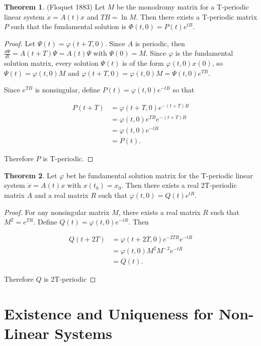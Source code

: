 \documentclass[12pt]{article}
\theoremstyle{definition}
\newtheorem{theorem}{Theorem}[section]  %
\begin{document}
\begin{theorem}(Floquet 1883)
Let $M$ be the monodromy matrix for a T-periodic linear system $\dot{x} = A(t)x$ and $TB = \ln M$. Then
there exists a T-periodic matrix $P$ such that the fundamental solution is $\Phi (t, 0) = P(t)e^{tB}$.
\end{theorem}

\begin{proof}
Let $\Psi (t) = \varphi(t + T, 0)$. Since $A$ is periodic, then  $\frac{d\Psi}{dt} = A(t + T)\Psi = A(t)\Psi$
with $\Psi(0) = M$. Since $\varphi$ is the fundamental solution matrix, every solution $\Psi(t)$ is of the
form $\varphi(t, 0)x(0)$, so $\Psi(t) = \varphi(t, 0)M$ and $\varphi(t + T, 0) = \varphi(t, 0)M = \Psi(t,0)e^{TB}$.

Since $e^{TB}$ is nonsingular, define $P(t) = \varphi(t, 0)e^{-tB}$ so that 

\begin{align*}
P(t + T) &= \varphi(t + T, 0)e^{-(t + T)B} \\
&= \varphi(t,0)e^{TB}e^{-(t + T)B} \\
&= \varphi(t, 0) e^{-tB} \\
&= P(t). 
\end{align*}

Therefore $P$ is T-periodic. 
\end{proof}

\begin{theorem}
Let $\varphi$ bet he fundamental solution matrix for the T-periodic linear system
$\dot{x} = A(t)x$ with $x(t_0) = x_0$. Then there exists a real 2T-periodic matrix
$A$ and a real matrix $R$ such that $\varphi(t, 0) = Q(t)e^{tR}$.
\end{theorem}

\begin{proof}
For any nonsingular matrix $M$, there exists a real matrix $R$ such that $M^2 = e^{TR}$.
Define $Q(t) = \varphi(t,0)e^{-tR}$. Then

\begin{align*}
Q(t + 2T) &= \varphi(t + 2T, 0)e^{-2TR}e^{-tR} \\
&= \varphi(t,0)M^2M^{-2}e^{-tR} \\
&= Q(t).
\end{align*}

Therefore $Q$ is 2T-periodic
\end{proof}


\section{Existence and Uniqueness for Non-Linear Systems}
\end{document}
